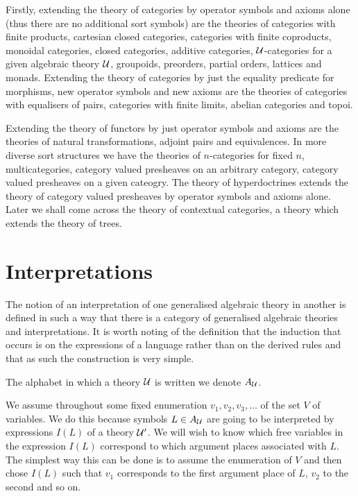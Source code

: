 Firstly, extending the theory of categories by operator symbols and axioms alone (thus there are no additional sort symbols) are the theories of categories with finite products, cartesian closed categories, categories with finite coproducts, monoidal categories, closed categories, additive categories, $\mathcal{U}$-categories for a given algebraic theory $\mathcal{U}$, groupoids, preorders, partial orders, lattices and monads.
%
Extending the theory of categories by just the equality predicate for morphisms, new operator symbols and new axioms are the theories of categories with equalisers of pairs, categories with finite limits, abelian categories and topoi.

Extending the theory of functors by just operator symbols and axioms are the theories of natural transformations, adjoint pairs and equivalences.
%
In more diverse sort structures we have the theories of $n$-categories for fixed $n$, multicategories, category valued presheaves on an arbitrary category, category valued presheaves on a given cateogry.
%
The theory of hyperdoctrines extends the theory of category valued presheaves by operator symbols and axioms alone.
%
Later we shall come across the theory of contextual categories, a theory which extends the theory of trees.

\section{Interpretations} \label{sec:source-1-11}

The notion of an interpretation of one generalised algebraic theory in another is defined in such a way that there is a category of generalised algebraic theories and interpretations.
%
It is worth noting of the definition that the induction that occurs is on the expressions of a language rather than on the derived rules and that as such the construction is very simple.

The alphabet in which a theory $\mathcal{U}$ is written we denote $A_{\mathcal{U}}$.

We assume throughout some fixed enumeration $v_1,v_2,v_3,\ldots$ of the set $V$ of variables.
%
We do this because symbols $L\in A_{\mathcal{U}}$ are going to be interpreted by expressions $I(L)$ of a theory $\mathcal{U}'$.
%
We will wish to know which free variables in the expression $I(L)$ correspond to which argument places associated with $L$.
%
The simplest way this can be done is to assume the enumeration of $V$ and then chose $I(L)$ such that $v_1$ corresponds to the first argument place of $L$, $v_2$ to the second and so on.

